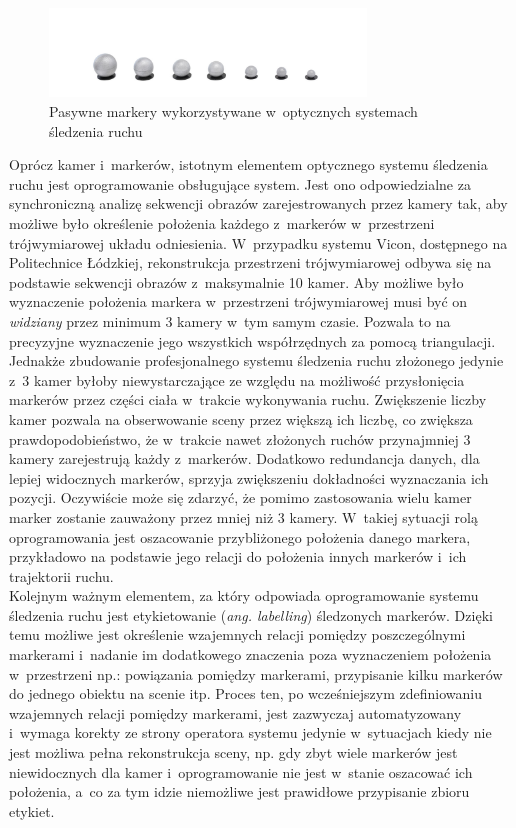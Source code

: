 \begin{figure}[!htp]
	\centering	
	\includegraphics[width=0.75\textwidth]{images/super-spherical-markers-hero.jpg}
	\caption{Pasywne markery wykorzystywane w~optycznych systemach śledzenia ruchu\cite{QulisysMarkers}}		
	\label{fig:literature:qualisys:markers}
\end{figure}

Oprócz kamer i~markerów, istotnym elementem optycznego systemu śledzenia ruchu jest oprogramowanie obsługujące system. Jest ono odpowiedzialne za synchroniczną analizę sekwencji obrazów zarejestrowanych przez kamery tak, aby możliwe było określenie położenia każdego z~markerów w~przestrzeni trójwymiarowej układu odniesienia. W~przypadku systemu Vicon, dostępnego na Politechnice Łódzkiej, rekonstrukcja przestrzeni trójwymiarowej odbywa się na podstawie sekwencji obrazów z~maksymalnie 10 kamer. Aby możliwe było wyznaczenie położenia markera w~przestrzeni trójwymiarowej musi być on \textsl{widziany} przez minimum 3 kamery w~tym samym czasie. Pozwala to na precyzyjne wyznaczenie jego wszystkich współrzędnych za pomocą triangulacji. Jednakże zbudowanie profesjonalnego systemu śledzenia ruchu złożonego jedynie z~3 kamer byłoby niewystarczające ze względu na możliwość przysłonięcia markerów przez części ciała w~trakcie wykonywania ruchu. Zwiększenie liczby kamer pozwala na obserwowanie sceny przez większą ich liczbę, co zwiększa prawdopodobieństwo, że w~trakcie nawet złożonych ruchów przynajmniej 3 kamery zarejestrują każdy z~markerów. Dodatkowo redundancja danych, dla lepiej widocznych markerów, sprzyja zwiększeniu dokładności wyznaczania ich pozycji. Oczywiście może się zdarzyć, że pomimo zastosowania wielu kamer marker zostanie zauważony przez mniej niż 3 kamery. W~takiej sytuacji rolą oprogramowania jest oszacowanie przybliżonego położenia danego markera, przykładowo na podstawie jego relacji do położenia innych markerów i~ich trajektorii ruchu.\\

Kolejnym ważnym elementem, za który odpowiada oprogramowanie systemu śledzenia ruchu jest etykietowanie (\emph{ang. labelling}) śledzonych markerów. Dzięki temu możliwe jest określenie wzajemnych relacji pomiędzy poszczególnymi markerami i~nadanie im dodatkowego znaczenia poza wyznaczeniem położenia w~przestrzeni np.: powiązania pomiędzy markerami, przypisanie kilku markerów do jednego obiektu na scenie itp. Proces ten, po wcześniejszym zdefiniowaniu wzajemnych relacji pomiędzy markerami, jest zazwyczaj automatyzowany i~wymaga korekty ze strony operatora systemu jedynie w~sytuacjach kiedy nie jest możliwa pełna rekonstrukcja sceny, np. gdy zbyt wiele markerów jest niewidocznych dla kamer i~oprogramowanie nie jest w~stanie oszacować ich położenia, a~co za tym idzie niemożliwe jest prawidłowe przypisanie zbioru etykiet.\\ 


